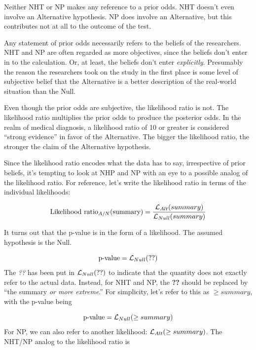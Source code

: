 \documentclass[
  letterpaper,
  DIV=11,
  numbers=noendperiod,
  oneside]{scrartcl}
\begin{document}
Neither NHT or NP makes any reference to a prior odds. NHT doesn't even
involve an Alternative hypothesis. NP does involve an Alternative, but
this contributes not at all to the outcome of the test.

Any statement of prior odds necessarily refers to the beliefs of the
researchers. NHT and NP are often regarded as more objectives, since the
beliefs don't enter in to the calculation. Or, at least, the beliefs
don't enter \emph{explicitly}. Presumably the reason the researchers
took on the study in the first place is some level of subjective belief
that the Alternative is a better description of the real-world situation
than the Null.

Even though the prior odds are subjective, the likelihood ratio is not.
The likelihood ratio multiplies the prior odds to produce the posterior
odds. In the realm of medical diagnosis, a likelihood ratio of 10 or
greater is considered ``strong evidence'' in favor of the Alternative.
{}
The bigger the likelihood ratio, the stronger the claim of the
Alternative hypothesis.

Since the likelihood ratio encodes what the data has to say,
irrespective of prior beliefs, it's tempting to look at NHP and NP with
an eye to a possible analog of the likelihood ratio. For reference,
let's write the likelihood ratio in terms of the individual likelihoods:

\[\text{Likelihood ratio}_{A/N}\text{(summary)} = \frac{{\cal L}_{Alt}(summary)}{{\cal L}_{Null}(summary)}\]

It turns out that the p-value is in the form of a likelihood. The
assumed hypothesis is the Null.

\[\text{p-value} = {\cal L}_{Null}(??)\] The \emph{??} has been put in
\({\cal L}_{Null}(??)\) to indicate that the quantity does not exactly
refer to the actual data. Instead, for NHT and NP, the \textbf{??}
should be replaced by ``the summary \emph{or more extreme}.'' For
simplicity, let's refer to this as \(\geq summary\), with the p-value
being

\[\text{p-value} = {\cal L}_{Null}(\geq summary)\] For NP, we can also
refer to another likelihood: \({\cal L}_{Alt}(\geq summary)\). The
NHT/NP analog to the likelihood ratio is
\end{document}
